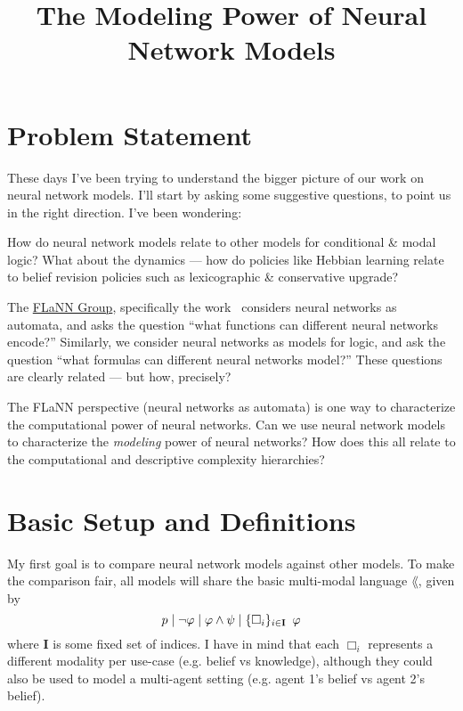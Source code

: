 \documentclass[letterpaper]{article}
\title{The Modeling Power of Neural Network Models}
\begin{document}
\maketitle

\section*{Problem Statement}

These days I've been trying to understand the bigger picture of our work on neural network models.  I'll start by asking some suggestive questions, to point us in the right direction. I've been wondering:

\begin{question}
    How do neural network models relate to other models for conditional \& modal logic?  What about the dynamics --- how do policies like Hebbian learning relate to belief revision policies such as lexicographic \& conservative upgrade?
\end{question}

\begin{question}
    The \href{http://flann.super.site/}{FLaNN Group}, specifically the work~\cite{merrill2019sequential,merrill2020formal,merrill2023expressive,strobl2024formal} considers neural networks as automata, and asks the question ``what functions can different neural networks encode?''  Similarly, we consider neural networks as models for logic, and ask the question ``what formulas can different neural networks model?''  These questions are clearly related --- but how, precisely?
\end{question}

\begin{question}
    The FLaNN perspective (neural networks as automata) is one way to characterize the computational power of neural networks.  Can we use neural network models to characterize the \emph{modeling} power of neural networks?  How does this all relate to the computational and descriptive complexity hierarchies?
\end{question}

\section*{Basic Setup and Definitions}

My first goal is to compare neural network models against other models.  To make the comparison fair, all models will share the basic multi-modal language $\lang$, given by
\[
    p \mid \neg \varphi \mid \varphi \land \psi \mid \{ \Box_i \}_{i \in \textbf{I}} \hspace*{0.5em} \varphi
\]
where \textbf{I} is some fixed set of indices.  I have in mind that each $\Box_i$ represents a different modality per use-case (e.g. belief vs knowledge), although they could also be used to model a multi-agent setting (e.g. agent 1's belief vs agent 2's belief).
\end{document}
